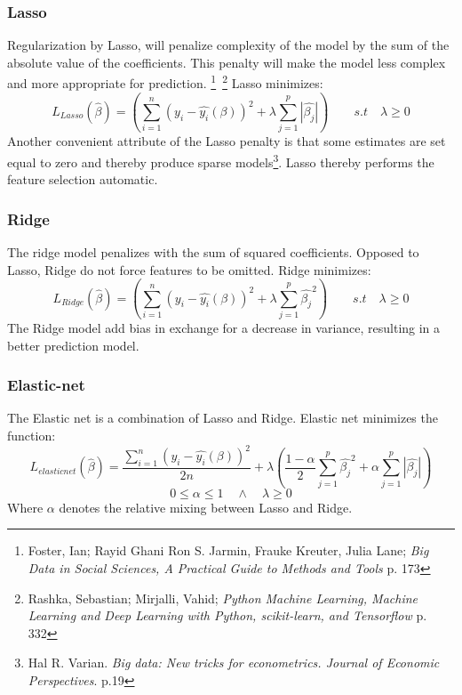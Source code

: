 \documentclass[12pt,a4paper]{article}
\begin{document}
\subsubsection{Lasso}
Regularization by Lasso, will penalize complexity of the model by the sum of the absolute value of the coefficients. This penalty will make the model less complex and more appropriate for prediction.  \footnote{Foster, Ian; Rayid Ghani Ron S. Jarmin, Frauke Kreuter, Julia Lane; \textit{Big Data in Social Sciences, A Practical Guide to Methods and Tools} p. 173}\, \footnote{Rashka, Sebastian; Mirjalli, Vahid; \textit{Python Machine Learning, Machine Learning and Deep Learning with Python, scikit-learn, and Tensorflow} p. 332}
\newline Lasso minimizes: $$L_{Lasso}(\hat{\beta}) = \left(\sum_{i=1}^{n} (y_i-\hat{y_i}(\beta))^2+\lambda\sum_{j=1}^{p}|\hat{\beta_j}|\right) \qquad s.t \quad \lambda \geq 0 $$
Another convenient attribute of the Lasso penalty is that some estimates are set equal to zero and thereby produce sparse models\footnote{Hal R. Varian. \textit{Big data: New tricks for econometrics. Journal of Economic Perspectives}. p.19}. Lasso thereby performs the feature selection automatic.   
\subsubsection{Ridge}
The ridge model penalizes with the sum of squared coefficients. Opposed to Lasso, Ridge do not force features to be omitted. Ridge minimizes:
$$L_{Ridge}(\hat{\beta}) = \left(\sum_{i=1}^{n} (y_i-\hat{y_i}(\beta))^2+\lambda\sum_{j=1}^{p}\hat{\beta_j}^2\right) \qquad s.t \quad \lambda \geq 0 $$ 
The Ridge model add bias in exchange for a decrease in variance, resulting in a better prediction model. 

\subsubsection{Elastic-net}
The Elastic net is a combination of Lasso and Ridge. Elastic net minimizes the function: 
$$L_{elasticnet}(\hat{\beta}) = \frac{\sum_{i=1}^{n}\left(y_i-\hat{y_i}(\beta)\right)^2}{2n} + \lambda\left(\frac{1-\alpha}{2}\sum_{j=1}^{p}\hat{\beta_j}^2+\alpha\sum_{j=1}^{p}|\hat{\beta_j}|\right)$$
$$0 \leq \alpha \leq 1 \quad \wedge \quad \lambda \geq 0$$
Where $\alpha$ denotes the relative mixing between Lasso and Ridge. 
\end{document}
